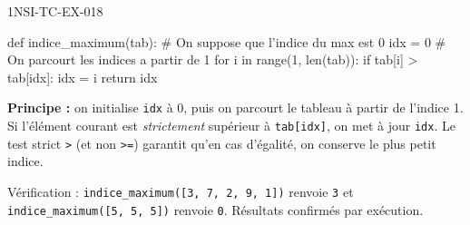 \begin{corrige}{1NSI-TC-EX-018}
\begin{python}
def indice_maximum(tab):
    # On suppose que l'indice du max est 0
    idx = 0
    # On parcourt les indices a partir de 1
    for i in range(1, len(tab)):
        if tab[i] > tab[idx]:
            idx = i
    return idx
\end{python}

\textbf{Principe :} on initialise \lstinline{idx} à 0, puis on parcourt le tableau à partir de l'indice 1. Si l'élément courant est \emph{strictement} supérieur à \lstinline{tab[idx]}, on met à jour \lstinline{idx}. Le test strict \lstinline{>} (et non \lstinline{>=}) garantit qu'en cas d'égalité, on conserve le plus petit indice.

Vérification : \lstinline{indice_maximum([3, 7, 2, 9, 1])} renvoie \lstinline{3} et \lstinline{indice_maximum([5, 5, 5])} renvoie \lstinline{0}. Résultats confirmés par exécution.
\end{corrige}
